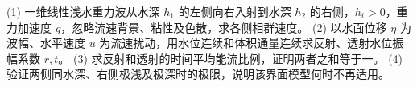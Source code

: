 (1) 一维线性浅水重力波从水深 \(h_1\) 的左侧向右入射到水深 \(h_2\) 的右侧，\(h_i>0\)，重力加速度 \(g\)，忽略流速背景、粘性及色散，求各侧相群速度。
(2) 以水面位移 \(\eta\) 为波幅、水平速度 \(u\) 为流速扰动，用水位连续和体积通量连续求反射、透射水位振幅系数 \(r,t\)。
(3) 求反射和透射的时间平均能流比例，证明两者之和等于一。
(4) 验证两侧同水深、右侧极浅及极深时的极限，说明该界面模型何时不再适用。
